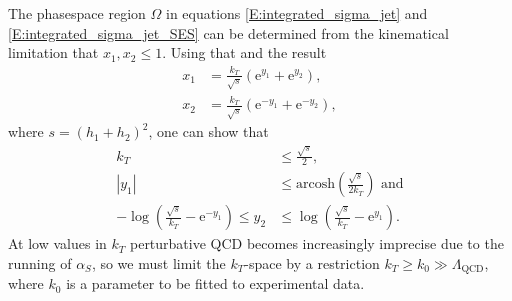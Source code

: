 \documentclass[a4paper, twoside, english, 12pt]{article}
\begin{document}
The phasespace region $\Omega$ in equations \eqref{E:integrated_sigma_jet} and \eqref{E:integrated_sigma_jet_SES} can be determined from the kinematical limitation that $x_1, x_2 \leq 1$. Using that and the result
\begin{align}
	x_1 &= \frac{k_T}{\sqrt{s}}\left(\mathrm{e}^{y_1}+\mathrm{e}^{y_2}\right)\label{E:x1_from_ktandys} ,\\[1em]
	x_2 &= \frac{k_T}{\sqrt{s}}\left(\mathrm{e}^{-y_1}+\mathrm{e}^{-y_2}\right)\label{E:x2_from_ktandys} , 
\end{align}
where $s = (h_1+h_2)^2$, one can show that 
\begin{align}
	k_T &\leq \frac{\sqrt{s}}{2}, \label{E:kt_limit} \\[1em]
	|y_1| &\leq \text{arcosh}\left(\frac{\sqrt{s}}{2k_T}\right) \text{ and} \label{E:y1_limits} \\[1em]
	-\log\left(\frac{\sqrt{s}}{k_T}-\mathrm{e}^{-y_1}\right) \leq y_2 &\leq \log\left(\frac{\sqrt{s}}{k_T}-\mathrm{e}^{y_1}\right)  \label{E:y2_limits} .
\end{align}
At low values in $k_T$ perturbative QCD becomes increasingly imprecise due to the running of $\alpha_S$, so we must limit the $k_T$-space by a restriction $k_T\geq k_0 \gg \Lambda_{\text{QCD}}$, where $k_0$ is a parameter to be fitted to experimental data.
\end{document}
